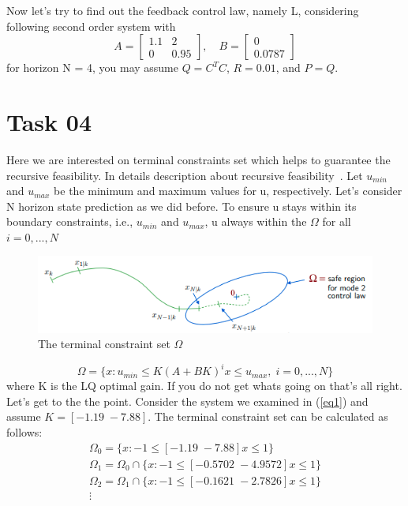 \documentclass[12pt]{article}%
\begin{document}
Now let's try to find out the feedback control law, namely L, considering following second order system with 
\begin{equation} \label{eq1}
   A = \begin{bmatrix}
1.1 & 2\\ 
0 & 0.95
\end{bmatrix}, \quad B = \begin{bmatrix}
0\\ 
0.0787
\end{bmatrix}
\end{equation} for horizon N = 4, you may assume $Q = C^TC$, $R=0.01$, and $P=Q$. 

\section{Task 04}
Here we are interested on terminal constraints set which helps to guarantee the recursive feasibility. In details description about recursive feasibility~\cite{mpc_1, rakovic2016model}.  Let $u_{min}$ and $u_{max}$ be the minimum and maximum values for u, respectively. Let's consider N horizon state prediction as we did before. To ensure u stays within its boundary constraints, i.e.,  $u_{min}$ and $u_{max}$, u always within the $\Omega$ for all $i=0,...,N$

\begin{figure}[H]
    \begin{center}
    \includegraphics[width=12cm]{terminal.png}
    \caption{The terminal constraint set $\Omega$}\label{f:constraint_set}
    \end{center}
\end{figure}

\begin{equation}
    \Omega = \{ x: u_{min} \leq K(A+BK)^ix \leq u_{max}, \; i=0,...,N\}
\end{equation} where K is the LQ optimal gain. If you do not get whats going on that's all right. Let's get to the the point. Consider the system we examined in (\ref{eq1}) and assume $K = [-1.19 \; -7.88]$. The terminal constraint set can be calculated as follows:
\begin{equation}
    \begin{aligned}
        \Omega_0 = \{x:-1\leq  [-1.19 \; -7.88]x \leq 1 \} \\
        \Omega_1 = \Omega_0 \cap \{x:-1\leq  [-0.5702 \; -4.9572]x \leq 1 \} \\
        \Omega_2 = \Omega_1 \cap \{x:-1\leq  [-0.1621 \; -2.7826]x \leq 1 \} \\
        \vdots
    \end{aligned}
\end{equation}
\end{document}
